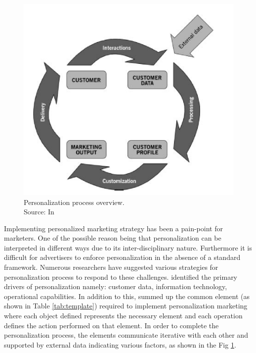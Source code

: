 \begin{figure}
    \centering
    \includegraphics[scale=0.5]{chapters/figures/Personalization_process.png}
    \caption{Personalization process overview. \\
    Source: In \autocite[10]{VesanenRaulas2007}}
    \label{fig:Personalization_process}
\end{figure}


Implementing personalized marketing strategy has been a pain-point for marketers. One of the possible reason being that personalization can be interpreted in different ways due to its inter-disciplinary nature. Furthermore it is difficult for advertisers to enforce personalization in the absence of a standard framework. Numerous researchers have suggested various strategies for personalization process to respond to these challenges. \textcite[18]{Wind2001} identified the primary drivers of personalization namely: customer data, information technology, operational capabilities. In addition to this, \textcite[7]{VesanenRaulas2007} summed up the common element (as shown in Table \ref{tab:template}) required to implement personalization marketing where each object defined represents the necessary element and each operation defines the action performed on that element. In order to complete the personalization process, the elements communicate iterative with each other and supported by external data indicating various factors, as shown in the Fig \ref{fig:Personalization_process}.  \\ \par


